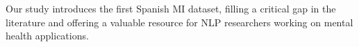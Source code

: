 
Our study introduces the first Spanish MI dataset, filling a critical gap in the literature and offering a valuable resource for NLP researchers working on mental health applications.





